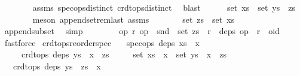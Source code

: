 \begin{isabellebody}
\ \ \ \ \ \ \isamarkupfalse%
\ assms\ spec{\isacharunderscore}ops{\isacharunderscore}distinct\ crdt{\isacharunderscore}ops{\isacharunderscore}distinct\ \isamarkupfalse%
\ blast{\isacharplus}\isanewline
\ \ \ \ \isamarkupfalse%
\ {\isachardoublequoteopen}set\ xs\ {\isacharequal}\ set\ {\isacharparenleft}ys\ {\isacharat}\ zs{\isacharparenright}{\isachardoublequoteclose}\isanewline
\ \ \ \ \ \ \isamarkupfalse%
\ {\isacharparenleft}meson\ append{\isacharunderscore}set{\isacharunderscore}rem{\isacharunderscore}last\ assms{\isacharparenleft}{}{\isacharparenright}{\isacharparenright}\isanewline
\ \ \ \ \isamarkupfalse%
\ \isamarkupfalse%
\ {\isachardoublequoteopen}set\ zs\ {\isasymsubseteq}\ set\ xs{\isachardoublequoteclose}\isanewline
\ \ \ \ \ \ \isamarkupfalse%
\ append{\isacharunderscore}subset{\isacharparenleft}{}{\isacharparenright}\ \isamarkupfalse%
\ simp\isanewline
\ \ \isamarkupfalse%
\isanewline
\ \ \isamarkupfalse%
\ \isamarkupfalse%
\ {\isachardoublequoteopen}{\isasymAnd}op{}\ r{\isachardot}\ op{}\ {\isasymin}\ snd\ {\isacharbackquote}\ set\ zs\ {\isasymLongrightarrow}\ r\ {\isasymin}\ deps\ op{}\ {\isasymLongrightarrow}\ r\ {\isasymnoteq}\ oid{\isachardoublequoteclose}\isanewline
\ \ \ \ \isamarkupfalse%
\ fastforce\isanewline
{}\isamarkupfalse%
%
\endisatagproof
{\isafoldproof}%
%
\isadelimproof
\isanewline
%
\endisadelimproof
\isanewline
{}\isamarkupfalse%
\ crdt{\isacharunderscore}ops{\isacharunderscore}reorder{\isacharunderscore}spec{\isacharcolon}\isanewline
\ \ \ {\isachardoublequoteopen}spec{\isacharunderscore}ops\ deps\ {\isacharparenleft}xs\ {\isacharat}\ {\isacharbrackleft}x{\isacharbrackright}{\isacharparenright}{\isachardoublequoteclose}\isanewline
\ \ \ \ \ {\isachardoublequoteopen}crdt{\isacharunderscore}ops\ deps\ {\isacharparenleft}ys\ {\isacharat}\ {\isacharbrackleft}x{\isacharbrackright}\ {\isacharat}\ zs{\isacharparenright}{\isachardoublequoteclose}\isanewline
\ \ \ \ \ {\isachardoublequoteopen}set\ {\isacharparenleft}xs\ {\isacharat}\ {\isacharbrackleft}x{\isacharbrackright}{\isacharparenright}\ {\isacharequal}\ set\ {\isacharparenleft}ys\ {\isacharat}\ {\isacharbrackleft}x{\isacharbrackright}\ {\isacharat}\ zs{\isacharparenright}{\isachardoublequoteclose}\isanewline
\ \ \ {\isachardoublequoteopen}crdt{\isacharunderscore}ops\ deps\ {\isacharparenleft}ys\ {\isacharat}\ zs\ {\isacharat}\ {\isacharbrackleft}x{\isacharbrackright}{\isacharparenright}{\isachardoublequoteclose}\isanewline

\end{isabellebody}
